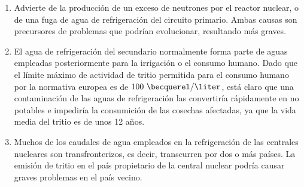 \begin{enumerate}

\item  Advierte de la producción de un exceso de neutrones por el reactor nuclear, o de una fuga de agua de refrigeración del circuito primario. Ambas causas son precursores de problemas que podrían evolucionar, resultando más graves.

\item  El agua de refrigeración del secundario normalmente forma parte de aguas  empleadas posteriormente para la irrigación o el consumo humano. Dado que el límite máximo de actividad de tritio permitida para el consumo humano por la normativa europea  es de $100~\becquerel/\liter$, está claro que  una contaminación de las aguas de refrigeración las convertiría rápidamente en no potables e impediría la consumición de las cosechas afectadas, ya que la vida media del tritio es de unos 12 años.

\item  Muchos de los caudales de agua empleados en la refrigeración de las centrales nucleares son transfronterizos, es decir, transcurren por dos o más países.  La emisión de tritio en el país propietario de la central nuclear podría causar graves problemas en el país vecino.


\end{enumerate}


